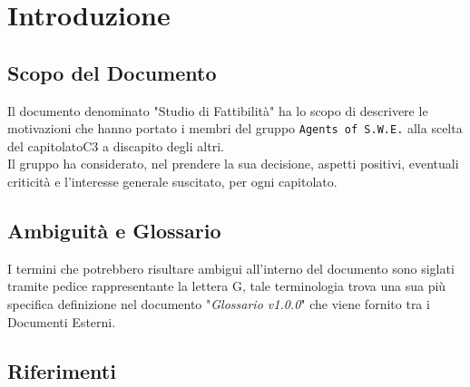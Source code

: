\section{Introduzione}

\subsection{Scopo del Documento}
Il documento denominato "Studio di Fattibilità" ha lo scopo di descrivere le motivazioni che hanno portato i membri del gruppo \texttt{Agents of S.W.E.} alla scelta del capitolato\glossario C3 a discapito degli altri.\\
Il gruppo ha considerato, nel prendere la sua decisione, aspetti positivi, eventuali criticità e l'interesse generale suscitato, per ogni capitolato.

\subsection{Ambiguità e Glossario}
I termini che potrebbero risultare ambigui all'interno del documento sono siglati tramite pedice rappresentante la lettera \textmd{G}, tale terminologia trova una sua più specifica definizione nel documento "\textit{Glossario v1.0.0}" che viene fornito tra i Documenti Esterni.

\subsection{Riferimenti}
